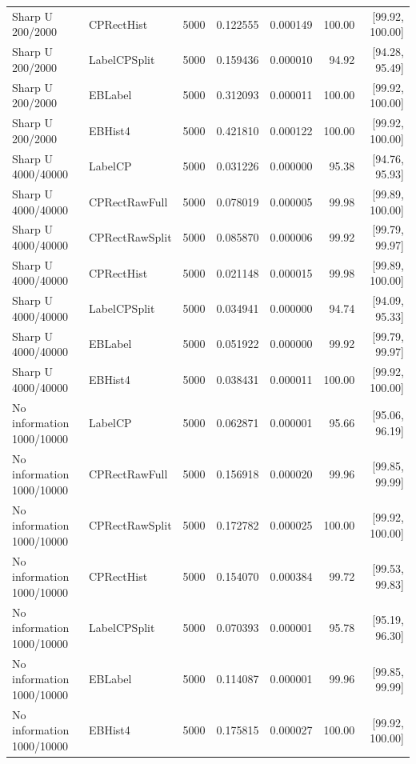 \begin{longtable}{llrrrrr}
Sharp U 200/2000 & CPRectHist & 5000 & 0.122555 & 0.000149 & 100.00 & [99.92, 100.00]\\
Sharp U 200/2000 & LabelCPSplit & 5000 & 0.159436 & 0.000010 & 94.92 & [94.28, 95.49]\\
Sharp U 200/2000 & EBLabel & 5000 & 0.312093 & 0.000011 & 100.00 & [99.92, 100.00]\\
Sharp U 200/2000 & EBHist4 & 5000 & 0.421810 & 0.000122 & 100.00 & [99.92, 100.00]\\
Sharp U 4000/40000 & LabelCP & 5000 & 0.031226 & 0.000000 & 95.38 & [94.76, 95.93]\\
Sharp U 4000/40000 & CPRectRawFull & 5000 & 0.078019 & 0.000005 & 99.98 & [99.89, 100.00]\\
Sharp U 4000/40000 & CPRectRawSplit & 5000 & 0.085870 & 0.000006 & 99.92 & [99.79, 99.97]\\
Sharp U 4000/40000 & CPRectHist & 5000 & 0.021148 & 0.000015 & 99.98 & [99.89, 100.00]\\
Sharp U 4000/40000 & LabelCPSplit & 5000 & 0.034941 & 0.000000 & 94.74 & [94.09, 95.33]\\
Sharp U 4000/40000 & EBLabel & 5000 & 0.051922 & 0.000000 & 99.92 & [99.79, 99.97]\\
Sharp U 4000/40000 & EBHist4 & 5000 & 0.038431 & 0.000011 & 100.00 & [99.92, 100.00]\\
No information 1000/10000 & LabelCP & 5000 & 0.062871 & 0.000001 & 95.66 & [95.06, 96.19]\\
No information 1000/10000 & CPRectRawFull & 5000 & 0.156918 & 0.000020 & 99.96 & [99.85, 99.99]\\
No information 1000/10000 & CPRectRawSplit & 5000 & 0.172782 & 0.000025 & 100.00 & [99.92, 100.00]\\
No information 1000/10000 & CPRectHist & 5000 & 0.154070 & 0.000384 & 99.72 & [99.53, 99.83]\\
No information 1000/10000 & LabelCPSplit & 5000 & 0.070393 & 0.000001 & 95.78 & [95.19, 96.30]\\
No information 1000/10000 & EBLabel & 5000 & 0.114087 & 0.000001 & 99.96 & [99.85, 99.99]\\
No information 1000/10000 & EBHist4 & 5000 & 0.175815 & 0.000027 & 100.00 & [99.92, 100.00]\\
\bottomrule
\end{longtable}